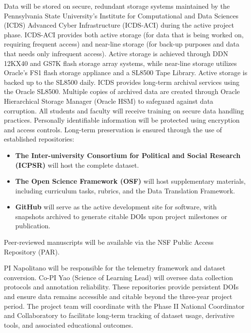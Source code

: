 \documentclass[11pt]{article}
\begin{document}
Data will be stored on secure, redundant storage systems maintained by the Pennsylvania State University’s Institute for Computational and Data Sciences (ICDS) Advanced Cyber Infrastructure (ICDS-ACI) during the active project phase. ICDS-ACI provides both active storage (for data that is being worked on, requiring frequent access) and near-line storage (for back-up purposes and data that needs only infrequent access). 
Active storage is achieved through DDN 12KX40 and GS7K flash storage array systems, while near-line storage utilizes Oracle’s FS1 flash storage appliance and a SL8500 Tape Library. Active storage is backed up to the SL8500 daily. ICDS provides long-term archival services using the Oracle SL8500. Multiple copies of archived data are created through Oracle Hierarchical Storage Manager (Oracle HSM) to safeguard against data corruption. All students and faculty will receive training on secure data handling practices. Personally identifiable information will be protected using encryption and access controls. 
Long-term preservation is ensured through the use of established repositories:
\vspace{-0.3cm}
\begin{itemize}
    \item \textbf{The Inter-university Consortium for Political and Social Research (ICPSR)} will host the complete dataset. \vspace{-0.3cm}
    \item \textbf{The Open Science Framework (OSF)} will host supplementary materials, including curriculum tasks, rubrics, and the Data Translation Framework. \vspace{-0.3cm}
    \item \textbf{GitHub} will serve as the active development site for software, with snapshots archived to generate citable DOIs upon project milestones or publication. \vspace{-0.3cm}
\end{itemize}
Peer-reviewed manuscripts will be available via the NSF Public Access Repository (PAR).

PI Napolitano will be responsible for the telemetry framework and dataset conversion.
Co-PI Yao (Science of Learning Lead) will oversee data collection protocols and annotation reliability.
These repositories provide persistent DOIs and ensure data remains accessible and citable beyond the three-year project period.
The project team will coordinate with the Phase II National Coordinator and Collaboratory to facilitate long-term tracking of dataset usage, derivative tools, and associated educational outcomes.
\end{document}
